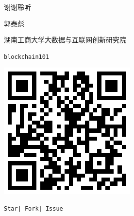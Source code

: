 \documentclass[11pt]{beamer}
\begin{document}
\begin{frame}
	\begin{minipage}[t]{0.5\linewidth}
		\begin{center}
			\begin{figure}
				\vspace{10pt}
				
				{\Huge 谢谢聆听}
				
				\vspace{30pt}
				郭泰彪
				
				\vspace{10pt}
				{\tiny 湖南工商大学大数据与互联网创新研究院}
			\end{figure}
			\begin{figure}
				
			\end{figure}
		\end{center}
	\end{minipage}%
	\begin{minipage}[t]{0.4\linewidth}
		\begin{figure}
			\centering
			\texttt{blockchain101}
			
			\includegraphics[width=0.6\linewidth]{figures/blockchain101qrcode}
			
			{\footnotesize \texttt{Star| Fork| Issue}}
		\end{figure}
	\end{minipage}%
\end{frame}
\end{document}
